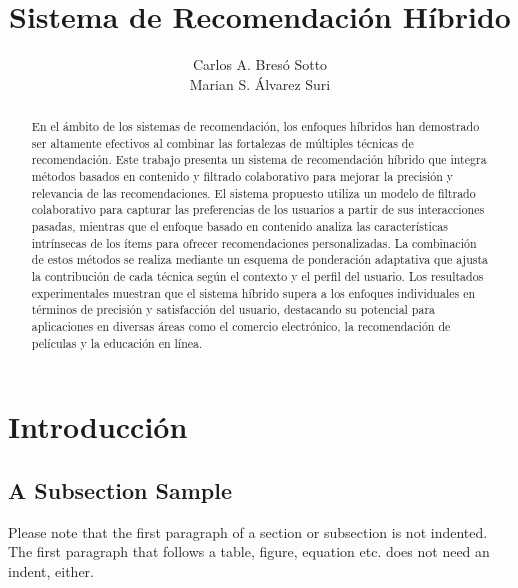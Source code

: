 \documentclass[runningheads]{llncs}
\begin{document}
%
\title{Sistema de Recomendación Híbrido}
%
%
\author{Carlos A. Bresó Sotto \\
Marian S. Álvarez Suri}
%
%
%
\maketitle              
%
\begin{abstract}    
    En el ámbito de los sistemas de recomendación, los enfoques híbridos han demostrado ser altamente efectivos al combinar las fortalezas de múltiples técnicas de recomendación. Este trabajo presenta un sistema de recomendación híbrido que integra métodos basados en contenido y filtrado colaborativo para mejorar la precisión y relevancia de las recomendaciones. El sistema propuesto utiliza un modelo de filtrado colaborativo para capturar las preferencias de los usuarios a partir de sus interacciones pasadas, mientras que el enfoque basado en contenido analiza las características intrínsecas de los ítems para ofrecer recomendaciones personalizadas. La combinación de estos métodos se realiza mediante un esquema de ponderación adaptativa que ajusta la contribución de cada técnica según el contexto y el perfil del usuario. Los resultados experimentales muestran que el sistema híbrido supera a los enfoques individuales en términos de precisión y satisfacción del usuario, destacando su potencial para aplicaciones en diversas áreas como el comercio electrónico, la recomendación de películas y la educación en línea.
    

\end{abstract}
%
%
%
\section{Introducción}
\subsection{A Subsection Sample}
Please note that the first paragraph of a section or subsection is
not indented. The first paragraph that follows a table, figure,
equation etc. does not need an indent, either.
\end{document}
